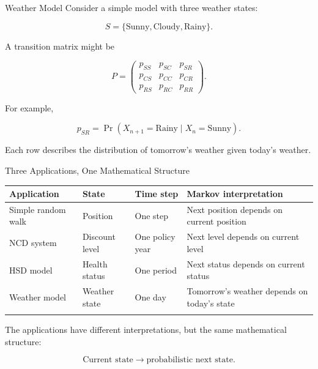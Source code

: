 \documentclass[
  ignorenonframetext,
  aspectratio=169,
]{beamer}
\newcounter{none} %
\begin{document}
\begin{frame}{Weather Model}
\protect{}\label{weather-model}
Consider a simple model with three weather states:

\[
S=\{\text{Sunny},\text{Cloudy},\text{Rainy}\}.
\]

A transition matrix might be

\[
P=
\begin{pmatrix}
p_{SS}&p_{SC}&p_{SR}\\
p_{CS}&p_{CC}&p_{CR}\\
p_{RS}&p_{RC}&p_{RR}
\end{pmatrix}.
\]

For example,

\[
p_{SR}
=\Pr(X_{n+1}=\text{Rainy}\mid X_n=\text{Sunny}).
\]

Each row describes the distribution of tomorrow's weather given today's
weather.
\end{frame}

\begin{frame}{Three Applications, One Mathematical Structure}
\protect{}\label{three-applications-one-mathematical-structure}
{\def\LTcaptype{none} %
\begin{longtable}[]{@{}
  >{\raggedright\arraybackslash}p{}
  >{\raggedright\arraybackslash}p{}
  >{\raggedright\arraybackslash}p{}
  >{\raggedright\arraybackslash}p{}@{}}
\toprule\noalign{}
\begin{minipage}[b]{\linewidth}\raggedright
Application
\end{minipage} & \begin{minipage}[b]{\linewidth}\raggedright
State
\end{minipage} & \begin{minipage}[b]{\linewidth}\raggedright
Time step
\end{minipage} & \begin{minipage}[b]{\linewidth}\raggedright
Markov interpretation
\end{minipage} \\
\midrule\noalign{}
\endhead
Simple random walk & Position & One step & Next position depends on
current position \\
NCD system & Discount level & One policy year & Next level depends on
current level \\
HSD model & Health status & One period & Next status depends on current
status \\
Weather model & Weather state & One day & Tomorrow's weather depends on
today's state \\
\bottomrule\noalign{}
\end{longtable}
}

The applications have different interpretations, but the same
mathematical structure:

\[
\boxed{
\text{Current state}
\longrightarrow
\text{probabilistic next state}.
}
\]
\end{frame}
\end{document}
